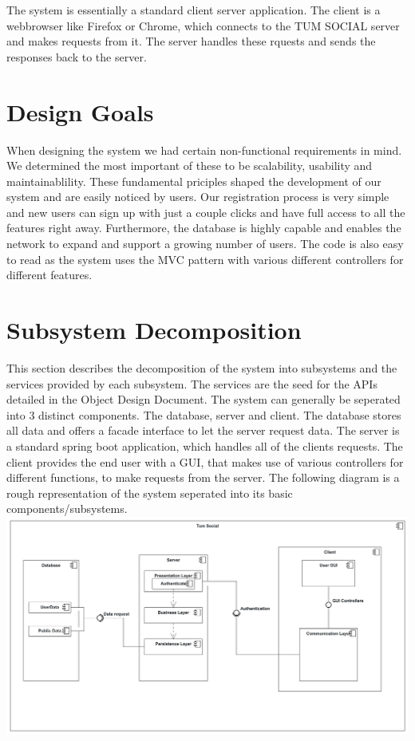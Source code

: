 \documentclass[a4paper,12pt]{scrartcl}
\begin{document}
    The system is essentially a standard client server application. The client is a webbrowser like Firefox or Chrome, which connects to the TUM SOCIAL server and makes requests from it.
    The server handles these rquests and sends the responses back to the server. 

     


    \section{Design Goals}
    
    When designing the system we had certain non-functional requirements in mind. We determined the most important of these to be scalability, usability and maintainablility. These fundamental priciples shaped the development of our system and are easily noticed by users. Our registration process is very simple and new users can sign up with just a couple clicks and have full access to all the features right away. Furthermore, the database is highly capable and enables the network to expand and support a growing number of users. The code is also easy to read as the system uses the MVC pattern with various different controllers for different features.


    \section{Subsystem Decomposition}
    This section describes the decomposition of the system into subsystems and the services provided by each subsystem. The services are the seed for the APIs detailed in the Object Design Document. The system can generally be seperated into 3 distinct components. The database, server and client. The database stores all data and offers a facade interface to let the server request data. The server is a standard spring boot application, which handles all of the clients requests. The client provides the end user with a GUI, that makes use of various controllers for different functions, to make requests from the server. The following diagram is a rough representation of the system seperated into its basic components/subsystems.\\
    	
    	
        \includegraphics[scale=0.15]{ComponentDiagram.png}
  
\end{document}
